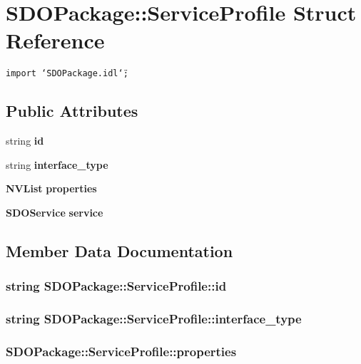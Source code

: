 \section{SDOPackage::Service\-Profile Struct Reference}
\label{structSDOPackage_1_1ServiceProfile}
{\tt import \char`\"{}SDOPackage.idl\char`\"{};}

\subsection*{Public Attributes}
\begin{CompactItemize}
\item 
string {\bf id}
\item 
string {\bf interface\_\-type}
\item 
{\bf NVList} {\bf properties}
\item 
{\bf SDOService} {\bf service}
\end{CompactItemize}


\subsection{Member Data Documentation}
\subsubsection{\setlength{\rightskip}{0pt plus 5cm}string {\bf SDOPackage::Service\-Profile::id}}\label{structSDOPackage_1_1ServiceProfile_SDOPackage_1_1ServiceProfileo0}


\subsubsection{\setlength{\rightskip}{0pt plus 5cm}string {\bf SDOPackage::Service\-Profile::interface\_\-type}}\label{structSDOPackage_1_1ServiceProfile_SDOPackage_1_1ServiceProfileo1}


\subsubsection{ {\bf SDOPackage::Service\-Profile::properties}}\label{structSDOPackage_1_1ServiceProfile_SDOPackage_1_1ServiceProfileo2}


